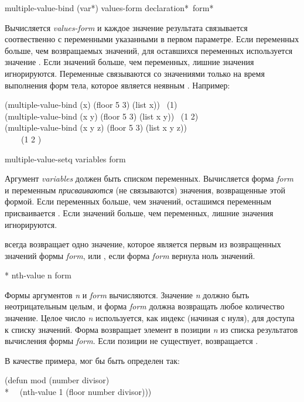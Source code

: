 \begin{defmac}
multiple-value-bind ({var}*) values-form
                    {declaration}* {\,form}*

Вычисляется \emph{values-form} и каждое значение результата связывается
соотвественно с переменными указанными в первом параметре.
Если переменных больше, чем возвращаемых значений, для оставшихся переменных
используется значение {\false}. Если значений больше, чем переменных, лишние
значения игнорируются. Переменные связываются со значениями только на время
выполнения форм тела, которое является неявным .
Например:
\begin{lisp}
(multiple-value-bind (x) (floor 5 3) (list x)) \EV\ (1) \\
(multiple-value-bind (x y) (floor 5 3) (list x y)) \EV\ (1 2) \\
(multiple-value-bind (x y z) (floor 5 3) (list x y z)) \\
~~~\EV\ (1 2 {\false})
\end{lisp}
\end{defmac}

\begin{defmac}
multiple-value-setq variables form

Аргумент \emph{variables} должен быть списком переменных. Вычисляется форма
\emph{form} и переменным \emph{присваиваются} (не связываются) значения,
возвращенные этой формой. Если переменных больше, чем значений, осташимся
переменным присваивается {\false}. Если значений больше, чем переменных, лишние
значения игнорируются.

 всегда возвращает одно значение, которое является
первым из возвращенных значений формы \emph{form}, или {\false}, если форма
\emph{form} вернула ноль значений.
\end{defmac}

\begin{defmac}*
nth-value n form

Формы аргументов \emph{n} и \emph{form} вычисляются.
Значение \emph{n} должно быть неотрицательным целым, и форма \emph{form} должна
возвращать любое количество значение.
Целое число \emph{n} используется, как индекс (начиная с нуля), для доступа к
списку значений.
Форма возвращает элемент в позиции \emph{n} из списка результатов вычисления
формы \emph{form}. Если позиции не существует, возвращается .

В качестве примера,  мог бы быть определен так:
\begin{lisp}
(defun mod (number divisor) \\*
~~(nth-value 1 (floor number divisor)))
\end{lisp}
\end{defmac}

